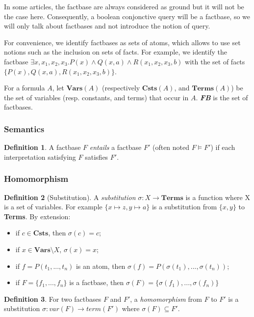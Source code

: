 \documentclass{article}
\theoremstyle{definition}
\newtheorem{definition}{Definition}[section]
\theoremstyle{remark}
\newcommand{\Vars}{\textbf{Vars}}
\newcommand{\Terms}{\textbf{Terms}}
\newcommand{\Csts}{\textbf{Csts}}
\begin{document}
In some articles, the factbase are always considered as ground but it will not be the case here. Consequently, a  boolean conjonctive query will be a factbase, so we will only talk about factbases and not introduce the notion of query.

For convenience, we identify factbases as sets of atoms, which allows to  use  set  notions  such  as  the  inclusion  on  sets  of  facts. For example, we identify the factbase $\exists x,x_{1},x_{2},x_{3}. P(x) \land Q(x,a) \land R(x_{1},x_{2},x_{3},b)$ with the set of facts $\{P(x),Q(x,a),R(x_{1},x_{2},x_{3},b)\}$.

For a formula $A$, let \emph{$\Vars(A)$} (respectively \emph{$\Csts(A)$}, and \emph{$\Terms(A)$}) be the set of variables (resp. constants, and terms) that occur in $A$. \emph{\textbf{FB}} is the set of factbases.

\subsubsection{Semantics}

\begin{definition}
A factbase $F$ \emph{entails} a factbase $F'$ (often noted $F \models F'$) if each interpretation satisfying $F$ satisfies $F'$.
\end{definition}	

\subsubsection{Homomorphism}

\begin{definition}[Substitution]
A \emph{substitution} $\sigma:X \to \Terms$ is a function where X is a set of variables. For example $\{x \mapsto z, y \mapsto a \}$ is a substitution from $\{x,y\}$ to \Terms. By extension: 
\begin{itemize}
\item if $c \in \Csts$, then $\sigma(c) = c$;
\item if $x \in \Vars \setminus X$, $\sigma(x) = x$;
\item if $f = P(t_1,...,t_n)$ is an atom, then $\sigma(f) = P(\sigma(t_1),...,\sigma(t_n))$;
\item if $F = \{f_1,...,f_n\}$ is a factbase, then $\sigma(F) = \{\sigma(f_1),...,\sigma(f_n)\}$
\end{itemize}
\end{definition}

\begin{definition}
For two factbases $F$ and $F'$, a \emph{homomorphism} from $F$ to $F'$ is a substitution $\sigma:var(F) \to term(F')$ where $\sigma(F) \subseteq F'$.
\end{definition}
\end{document}
